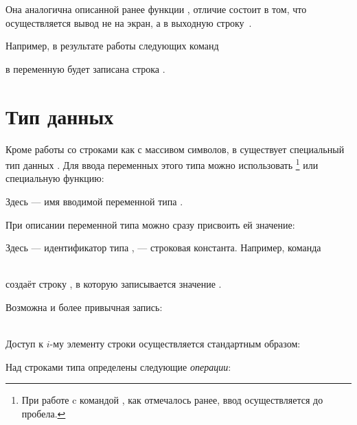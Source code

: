 
Она аналогична описанной ранее функции , отличие состоит в том, что осуществляется вывод не на
экран, а в выходную строку~.

Например, в результате работы следующих команд



в переменную  будет записана строка .

\section[Тип данных \Sys{string}]{Тип данных }\label{ch08:3}
Кроме работы со строками как с массивом символов, в  существует специальный тип данных .
Для ввода переменных этого типа можно использовать \footnote{При работе c командой
, как отмечалось ранее, ввод осуществляется до пробела.} или специальную функцию:


Здесь  --- имя вводимой переменной типа .

При описании переменной типа  можно сразу присвоить ей значение:


Здесь  --- идентификатор типа ,  --- строковая
константа. Например, команда

\\
создаёт строку , в которую записывается значение .

Возможна и более привычная запись:

\\

Доступ к $i$-му элементу строки осуществляется стандартным образом:


Над строками типа  определены следующие \emph{операции}:

